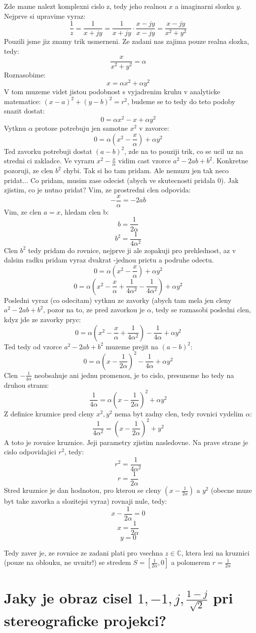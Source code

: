 Zde mame nalezt komplexni cislo z, tedy jeho realnou $x$ a imaginarni slozku $y$. Nejprve si upravime vyraz:
$$\frac{1}{z} = \frac{1}{x+jy} = \frac{1}{x+jy}\cdot \frac{x-jy}{x-jy} = \frac{x-jy}{x^2+y^2}$$
Pouzili jsme jiz znamy trik usmerneni. Ze zadani nas zajima pouze realna slozka, tedy:
$$\frac{x}{x^2+y^2} = \alpha$$
Roznasobime:
$$x = \alpha x^2 + \alpha y^2$$
V tom muzeme videt jistou podobnost s vyjadrenim kruhu v analyticke matematice: $(x-a)^2 + (y-b)^2 = r^2$, budeme se to tedy do teto podoby snazit dostat:
$$0 = \alpha x^2 - x + \alpha y^2$$
Vytknu $\alpha$ protoze potrebuju jen samotne $x^2$ v zavorce:
$$0 = \alpha (x^2 - \frac{x}{\alpha})+\alpha y^2$$
Ted zavorku potrebuji dostat $(a-b)^2$, zde na to pouziji trik, co se ucil uz na stredni ci zakladce. Ve vyrazu $x^2 - \frac{x}{\alpha}$ vidim cast vzorce $a^2-2ab+b^2$. Konkretne pozoruji, ze clen $b^2$ chybi. Tak si ho tam pridam. Ale nemuzu jen tak neco pridat... Co pridam, musim zase odecist (abych ve skutecnosti pridala 0). Jak zjistim, co je nutno pridat? Vim, ze prostredni clen odpovida:
$$-\frac{x}{\alpha} = -2ab$$
Vim, ze clen $a = x$, hledam clen b:
$$b = \frac{1}{2\alpha}$$
$$b^2 = \frac{1}{4 \alpha^2}$$
Clen $b^2$ tedy pridam do rovnice, nejprve ji ale zopakuji pro prehlednost, az v dalsim radku pridam vyraz dvakrat -jednou prictu a podruhe odectu.
$$0 = \alpha (x^2 - \frac{x}{\alpha})+\alpha y^2$$
$$0 = \alpha  \left(x^2 - \frac{x}{\alpha} + \frac{1}{4 \alpha^2} - \frac{1}{4 \alpha^2}\right) +\alpha y^2$$
Posledni vyraz (co odecitam) vytknu ze zavorky (abych tam mela jen cleny $a^2-2ab+b^2$, pozor na to, ze pred zavorkou je $\alpha$, tedy se roznasobi posledni clen, kdyz jde ze zavorky pryc:
$$0 = \alpha \left(x^2 - \frac{x}{\alpha} + \frac{1}{4 \alpha^2}\right)- \frac{1}{4 \alpha} +\alpha y^2$$
Ted tedy od vzorce  $a^2-2ab+b^2$ muzeme prejit na $(a-b)^2$:
$$0 = \alpha \left(x-\frac{1}{2\alpha}\right)^2  - \frac{1}{4 \alpha} +\alpha y^2$$
Clen $ - \frac{1}{4 \alpha}$ neobsahuje ani jednu promenou, je to cislo, presuneme ho tedy na druhou stranu:
$$ \frac{1}{4 \alpha} = \alpha \left(x-\frac{1}{2\alpha}\right)^2 +\alpha y^2$$
Z definice kruznice pred cleny $x^2, y^2$ nema byt zadny clen, tedy rovnici vydelim $\alpha$:
$$ \frac{1}{4 \alpha^2} = \left(x-\frac{1}{2\alpha}\right)^2 +y^2$$
A toto je rovnice kruznice. Jeji parametry zjistim nasledovne. Na prave strane je cislo odpovidajici $r^2$, tedy:
$$r^2 = \frac{1}{4\alpha^2}$$
$$r = \frac{1}{2\alpha}$$
Stred kruznice je dan hodnotou, pro kterou se cleny
$\left(x-\frac{1}{2\alpha}\right)$ a $y^2$ (obecne muze byt take zavorka a slozitejsi vyraz) rovnaji nule, tedy:
$$x-\frac{1}{2\alpha} = 0$$
$$x = \frac{1}{2\alpha}$$
$$y = 0$$

Tedy zaver je, ze rovnice ze zadani plati pro vsechna $z \in \mathbb{C}$, ktera lezi na kruznici (pouze na oblouku, ne uvnitr!) se stredem $S=\left[\frac{1}{2\alpha},0\right]$ a polomerem $r=\frac{1}{2\alpha}$


\section{Jaky je obraz cisel $1, -1, j, \frac{1-j}{\sqrt{2}}$ pri stereograficke projekci?}




